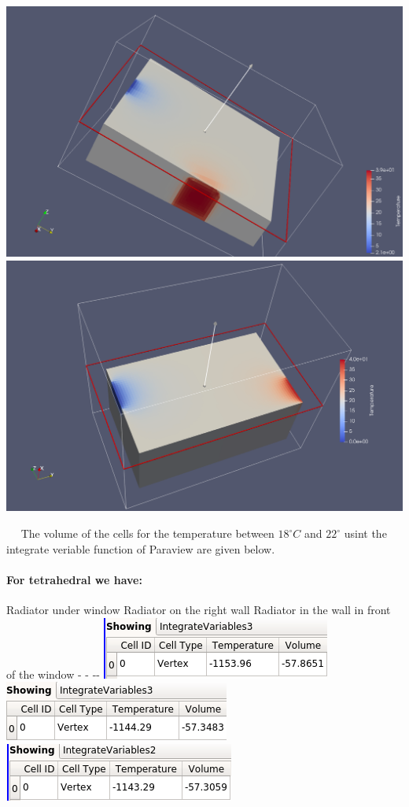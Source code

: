 \documentclass[11pt]{article}
\makeatletter
\def\maxwidth{\ifdim\Gin@nat@width>\linewidth\linewidth
    \else\Gin@nat@width\fi}
\let\Oldincludegraphics\includegraphics
\renewcommand{\includegraphics}[1]{\Oldincludegraphics[width=.8\maxwidth]{#1}}
\makeatother
\begin{document}
\includegraphics{ClipdroitCubic.png} \textbar{}
\includegraphics{ClippDevantCubs.png}

~ ~The volume of the cells for the temperature between \(18^\circ C\)
and \(22^\circ\) usint the integrate veriable function of Paraview are
given below.

\hypertarget{for-tetrahedral-we-have}{%
\paragraph{For tetrahedral we have:}\label{for-tetrahedral-we-have}}

Radiator under window\textbar{} Radiator on the right wall \textbar{}
Radiator in the wall in front of the window - \textbar{} - -\textbar{}-
\includegraphics{IntearVar147655.png} \textbar{}
\includegraphics{IntVarDroitTetra.png} \textbar{}
\includegraphics{IntVarDevanTetra.png}
\end{document}
